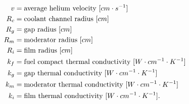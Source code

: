 \begin{align}
    v &= \mbox{average helium velocity } [cm \cdot s^{-1}] \notag \\
    R_c &= \mbox{coolant channel radius } [cm] \notag \\
    R_g &= \mbox{gap radius } [cm] \notag \\
    R_m &= \mbox{moderator radius } [cm] \notag \\
    R_i &= \mbox{film radius } [cm] \notag \\
    k_f &= \mbox{fuel compact thermal conductivity } [W \cdot cm^{-1} \cdot K^{-1}] \notag \\
    k_g &= \mbox{gap thermal conductivity } [W \cdot cm^{-1} \cdot K^{-1}] \notag \\
    k_m &= \mbox{moderator thermal conductivity } [W \cdot cm^{-1} \cdot K^{-1}] \notag \\
    k_i &= \mbox{film thermal conductivity } [W \cdot cm^{-1} \cdot K^{-1}]. \notag
\end{align}

